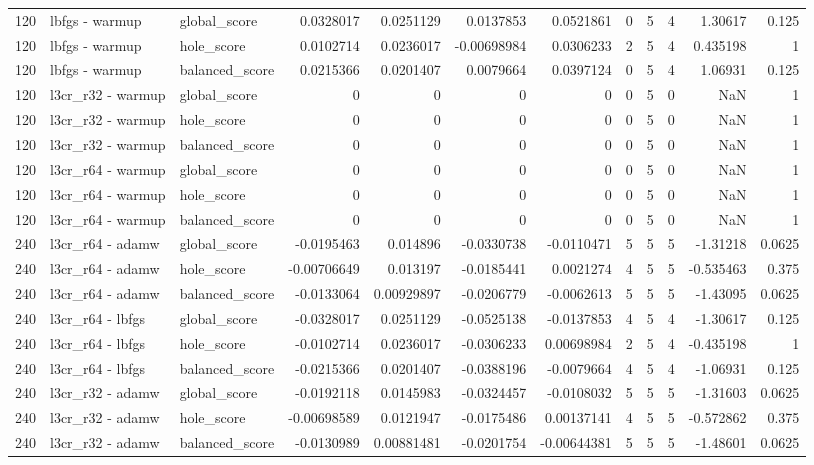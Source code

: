 \begin{tabular}{rllrrrrrrrrr}
120 & lbfgs - warmup & global_score & 0.0328017 & 0.0251129 & 0.0137853 & 0.0521861 & 0 & 5 & 4 & 1.30617 & 0.125 \\
120 & lbfgs - warmup & hole_score & 0.0102714 & 0.0236017 & -0.00698984 & 0.0306233 & 2 & 5 & 4 & 0.435198 & 1 \\
120 & lbfgs - warmup & balanced_score & 0.0215366 & 0.0201407 & 0.0079664 & 0.0397124 & 0 & 5 & 4 & 1.06931 & 0.125 \\
120 & l3cr_r32 - warmup & global_score & 0 & 0 & 0 & 0 & 0 & 5 & 0 & NaN & 1 \\
120 & l3cr_r32 - warmup & hole_score & 0 & 0 & 0 & 0 & 0 & 5 & 0 & NaN & 1 \\
120 & l3cr_r32 - warmup & balanced_score & 0 & 0 & 0 & 0 & 0 & 5 & 0 & NaN & 1 \\
120 & l3cr_r64 - warmup & global_score & 0 & 0 & 0 & 0 & 0 & 5 & 0 & NaN & 1 \\
120 & l3cr_r64 - warmup & hole_score & 0 & 0 & 0 & 0 & 0 & 5 & 0 & NaN & 1 \\
120 & l3cr_r64 - warmup & balanced_score & 0 & 0 & 0 & 0 & 0 & 5 & 0 & NaN & 1 \\
240 & l3cr_r64 - adamw & global_score & -0.0195463 & 0.014896 & -0.0330738 & -0.0110471 & 5 & 5 & 5 & -1.31218 & 0.0625 \\
240 & l3cr_r64 - adamw & hole_score & -0.00706649 & 0.013197 & -0.0185441 & 0.0021274 & 4 & 5 & 5 & -0.535463 & 0.375 \\
240 & l3cr_r64 - adamw & balanced_score & -0.0133064 & 0.00929897 & -0.0206779 & -0.0062613 & 5 & 5 & 5 & -1.43095 & 0.0625 \\
240 & l3cr_r64 - lbfgs & global_score & -0.0328017 & 0.0251129 & -0.0525138 & -0.0137853 & 4 & 5 & 4 & -1.30617 & 0.125 \\
240 & l3cr_r64 - lbfgs & hole_score & -0.0102714 & 0.0236017 & -0.0306233 & 0.00698984 & 2 & 5 & 4 & -0.435198 & 1 \\
240 & l3cr_r64 - lbfgs & balanced_score & -0.0215366 & 0.0201407 & -0.0388196 & -0.0079664 & 4 & 5 & 4 & -1.06931 & 0.125 \\
240 & l3cr_r32 - adamw & global_score & -0.0192118 & 0.0145983 & -0.0324457 & -0.0108032 & 5 & 5 & 5 & -1.31603 & 0.0625 \\
240 & l3cr_r32 - adamw & hole_score & -0.00698589 & 0.0121947 & -0.0175486 & 0.00137141 & 4 & 5 & 5 & -0.572862 & 0.375 \\
240 & l3cr_r32 - adamw & balanced_score & -0.0130989 & 0.00881481 & -0.0201754 & -0.00644381 & 5 & 5 & 5 & -1.48601 & 0.0625 \\

\end{tabular}
